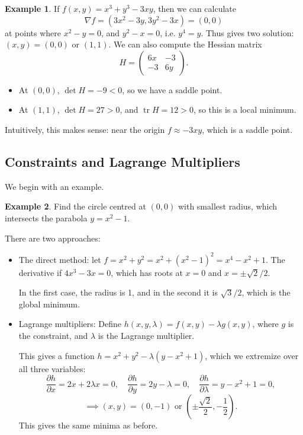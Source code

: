 \documentclass[12pt]{article}
\DeclareMathOperator{\tr}{tr}
\theoremstyle{definition}
\newtheorem{example}{Example}[section]
\theoremstyle{remark}
\begin{document}
\begin{adjustbox}{minipage = \columnwidth - 25.5pt, margin=1em, frame=1pt, margin=0em}
\begin{example}
	If $f(x, y) = x^3 + y^3 - 3xy$, then we can calculate
	\[
		\nabla f = (3x^2 - 3y, 3y^2 - 3x) = (0, 0)
	\]
	at points where $x^2 - y = 0$, and $y^2 - x = 0$, i.e. $y^{4} = y$. Thus gives two solution: $(x, y) = (0, 0)$ or $(1, 1)$. We can also compute the Hessian matrix
	\[
	H = 
	\begin{pmatrix}
		6x & -3 \\
		-3 & 6y
	\end{pmatrix}
	.\]
	\begin{itemize}
		\item At $(0, 0)$, $\det H = -9 < 0$, so we have a saddle point.
		\item At $(1, 1)$, $\det H = 27 > 0$, and $\tr H = 12 > 0$, so this is a local minimum.
	\end{itemize}
	Intuitively, this makes sense: near the origin $f \approx -3xy$, which is a saddle point.
\end{example}

\end{adjustbox}

\subsection{Constraints and Lagrange Multipliers}%
\label{sub:constraints_and_lagrange_multipliers}

We begin with an example.

\begin{example}
	Find the circle centred at $(0, 0)$ with smallest radius, which intersects the parabola $y = x^2 - 1$.
\end{example}

There are two approaches:
\begin{itemize}
	\item The direct method: let $f = x^2 + y^2 = x^2 + (x^2 - 1)^2 = x^{4} - x^2 + 1$. The derivative if $4x^3 - 3x = 0$, which has roots at $x = 0$ and $x = \pm \sqrt{2}/2$.

		In the first case, the radius is 1, and in the second it is $\sqrt{3}/2$, which is the global minimum.
	\item Lagrange multipliers: Define $h(x, y, \lambda) = f(x, y) - \lambda g(x, y)$, where $g$ is the constraint, and $\lambda$ is the Lagrange multiplier.

		This gives a function $h = x^2 + y^2 - \lambda(y - x^2 + 1)$, which we extremize over all three variables:
		\[
		\frac{\partial h}{\partial x} = 2x + 2 \lambda x = 0, \quad \frac{\partial h}{\partial y} = 2y - \lambda = 0, \quad \frac{\partial h}{\partial \lambda} = y - x^2 + 1 = 0
		,\]
		\[
			\implies (x, y) = (0, -1) \text{ or } \left( \pm \frac{\sqrt 2}{2}, - \frac{1}{2} \right)
		.\]
		This gives the same minima as before.
\end{itemize}
\end{document}
